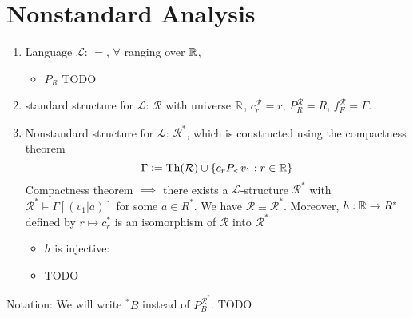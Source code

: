 \section{Nonstandard Analysis}\label{MT:sec:NSA}
\begin{enumerate}
    \item Language $\mathcal{L}$: $=$, $\forall$ ranging over $\mathbb{R}$,
    \begin{itemize}
        \item $P_R$ TODO
    \end{itemize}
    \item standard structure for $\mathcal{L}$: $\mathcal{R}$ with universe $\mathbb{R}$, $c_r^\mathcal{R} = r$, $P_R^\mathcal{R} = R$, $f^\mathcal{R}_F = F$.
    \item Nonstandard structure for $\mathcal{L}$: $\mathcal{R}^*$, which is constructed using the compactness theorem 
    \[\Gamma \vcentcolon= \operatorname{Th}(\mathcal{R}) \cup \{c_r P_< v_1 : r\in \mathbb{R}\}\]
    Compactness theorem $\implies$ there exists a $\mathcal{L}$-structure $\mathcal{R}^*$ with $\mathcal{R}^*\models \Gamma [(v_1 | a)]$ for some $a\in R^*$. We have $\mathcal{R}\equiv \mathcal{R}^*$.
    Moreover, $h: \mathbb{R} \to R^*$ defined by $r\mapsto c_r^*$ is an isomorphism of $\mathcal{R}$ into $\mathcal{R}^*$
    \begin{itemize}
        \item $h$ is injective:
        \item TODO
    \end{itemize}
\end{enumerate}
Notation: We will write $\!^*B$ instead of $P_B^{\mathcal{R}^*}$.
TODO

